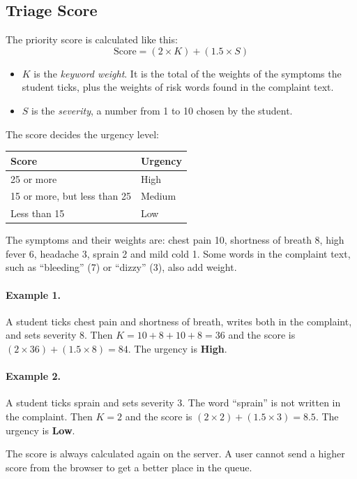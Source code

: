 \documentclass[12pt,a4paper]{article}
\begin{document}
\subsection{Triage Score}
The priority score is calculated like this:
\[
\text{Score} = (2 \times K) + (1.5 \times S)
\]
\begin{itemize}
  \item $K$ is the \emph{keyword weight}. It is the total of the weights of the symptoms the student ticks, plus the weights of risk words found in the complaint text.
  \item $S$ is the \emph{severity}, a number from 1 to 10 chosen by the student.
\end{itemize}
The score decides the urgency level:
\begin{center}
\begin{tabular}{@{}ll@{}}
\toprule
\textbf{Score} & \textbf{Urgency}\\
\midrule
25 or more & High\\
15 or more, but less than 25 & Medium\\
Less than 15 & Low\\
\bottomrule
\end{tabular}
\end{center}

The symptoms and their weights are: chest pain 10, shortness of breath 8, high fever 6, headache 3, sprain 2 and mild cold 1. Some words in the complaint text, such as ``bleeding'' (7) or ``dizzy'' (3), also add weight.

\paragraph{Example 1.} A student ticks chest pain and shortness of breath, writes both in the complaint, and sets severity 8. Then $K = 10 + 8 + 10 + 8 = 36$ and the score is $(2 \times 36) + (1.5 \times 8) = 84$. The urgency is \textbf{High}.

\paragraph{Example 2.} A student ticks sprain and sets severity 3. The word ``sprain'' is not written in the complaint. Then $K = 2$ and the score is $(2 \times 2) + (1.5 \times 3) = 8.5$. The urgency is \textbf{Low}.

The score is always calculated again on the server. A user cannot send a higher score from the browser to get a better place in the queue.
\end{document}
